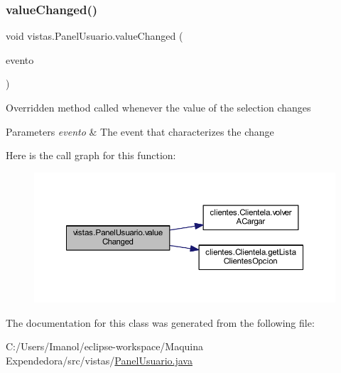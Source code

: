 \subsubsection{\texorpdfstring{value\+Changed()}{valueChanged()}}
{\footnotesize\ttfamily void vistas.\+Panel\+Usuario.\+value\+Changed (\begin{DoxyParamCaption}\item[{List\+Selection\+Event}]{evento }\end{DoxyParamCaption})}

Overridden method called whenever the value of the selection changes 
\begin{DoxyParams}{Parameters}
{\em evento} & The event that characterizes the change \\
\hline
\end{DoxyParams}
Here is the call graph for this function\+:
\nopagebreak
\begin{figure}[H]
\begin{center}
\leavevmode
\includegraphics[width=350pt]{classvistas_1_1_panel_usuario_a5cea3757537523a738660ae7bbb41030_cgraph}
\end{center}
\end{figure}


The documentation for this class was generated from the following file\+:\begin{DoxyCompactItemize}
\item 
C\+:/\+Users/\+Imanol/eclipse-\/workspace/\+Maquina Expendedora/src/vistas/\mbox{\hyperlink{_panel_usuario_8java}{Panel\+Usuario.\+java}}\end{DoxyCompactItemize}
